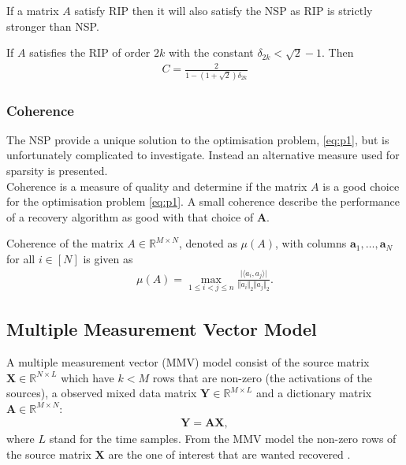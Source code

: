 If a matrix $A$ satisfy RIP then it will also satisfy the NSP as RIP is strictly stronger than NSP.
\begin{theorem}
If $A$ satisfies the RIP of order $2k$ with the constant $\delta_{2k} < \sqrt{2} -1$. Then
\begin{align*}
C = \frac{2}{1 - (1 + \sqrt{2}) \delta_{2k}}
\end{align*}
\end{theorem} 

\subsubsection{Coherence}
The NSP provide a unique solution to the optimisation problem, \eqref{eq:p1}, but is unfortunately complicated to investigate. Instead an alternative measure used for sparsity is presented.
\\%
Coherence is a measure of quality and determine if the matrix $A$ is a good choice for the optimisation problem \eqref{eq:p1}. A small coherence describe the performance of a recovery algorithm as good with that choice of $\mathbf{A}$. 
\begin{definition}[Coherence]
Coherence of the matrix $A \in \mathbb{R}^{M \times N}$, denoted as $\mu (A)$, with columns $\mathbf{a}_1, \dots, \mathbf{a}_N$ for all $i \in [N]$ is given as
\begin{align*}
\mu (A) = \max_{1 \leq i < j \leq n} \frac{\vert \langle a_i, a_j \rangle \vert}{\Vert a_i \Vert_2 \Vert a_j \Vert_2}.
\end{align*}
\end{definition}


\subsection{Multiple Measurement Vector Model}
A multiple measurement vector (MMV) model consist of the source matrix $\mathbf{X} \in \mathbb{R}^{N \times L}$ which have $k < M$ rows that are non-zero (the activations of the sources), a observed mixed data matrix $\mathbf{Y} \in \mathbb{R}^{M \times L}$ and a dictionary matrix $\mathbf{A} \in \mathbb{R}^{M \times N}$:
\begin{align*}
\mathbf{Y} = \mathbf{AX},
\end{align*}
where $L$ stand for the time samples. From the MMV model the non-zero rows of the source matrix $\mathbf{X}$ are the one of interest that are wanted recovered \cite[p. 11]{PHD}.


